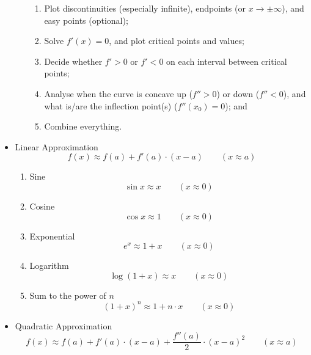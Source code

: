 \begin{itemize}
\begin{itemize}
\begin{enumerate}
						\item Plot discontinuities (especially infinite), endpoints (or $x \rightarrow \pm \infty$), and easy points (optional);
						\item Solve $f'(x)=0$, and plot critical points and values;
						\item Decide whether $f'>0$ or $f'<0$ on each interval between critical points;
						\item Analyse when the curve is concave up ($f'' > 0$) or down ($f'' < 0$), and what is/are the inflection point(s) ($f''(x_0) = 0$); and
						\item Combine everything.
					\end{enumerate}
			\end{itemize}
		\item Linear Approximation
			\begin{equation}
				f(x) \approx f(a) + f'(a) \cdot (x-a) \qquad (x \approx a)
			\end{equation}
			\begin{enumerate}
				\item Sine
					\begin{equation}
						\sin x \approx x \qquad (x \approx 0)
					\end{equation}
				\item Cosine
					\begin{equation}
						\cos x \approx 1 \qquad (x \approx 0)
					\end{equation}
				\item Exponential
					\begin{equation}
						e^x \approx 1+x \qquad (x \approx 0)
					\end{equation}
				\item Logarithm
					\begin{equation}
						\log(1+x) \approx x \qquad (x \approx 0)
					\end{equation}
				\item Sum to the power of $n$
					\begin{equation}
						(1+x)^n \approx 1+n \cdot x \qquad (x \approx 0)
					\end{equation}
			\end{enumerate}
		\item Quadratic Approximation
			\begin{equation}
				f(x) \approx f(a) + f'(a) \cdot (x-a) + \frac{f''(a)}{2} \cdot (x-a)^2 \qquad (x \approx a)
			\end{equation}
			\begin{enumerate}

\end{enumerate}
\end{itemize}

